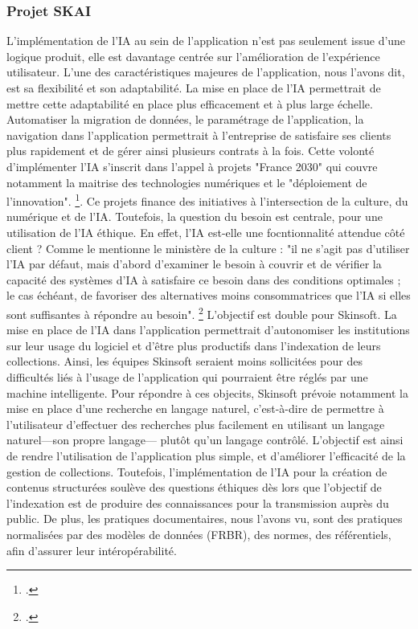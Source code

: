 \subsubsection{Projet SKAI}
L'implémentation de l'IA au sein de l'application n'est pas seulement issue d'une logique produit, elle est davantage centrée sur l'amélioration de l'expérience utilisateur. L'une des caractéristiques majeures de l'application, nous l'avons dit, est sa flexibilité et son adaptabilité. La mise en place de l'IA permettrait de mettre cette adaptabilité en place plus efficacement et à plus large échelle. Automatiser la migration de données, le paramétrage de l'application, la navigation dans l'application permettrait à l'entreprise de satisfaire ses clients plus rapidement et de gérer ainsi plusieurs contrats à la fois. Cette volonté d'implémenter l'IA s'inscrit dans l'appel à projets "France 2030" qui couvre notamment la maitrise des technologies numériques et le "déploiement de l'innovation". \footcite{zotero-item-636}. Ce projets finance des initiatives à l'intersection de la culture, du numérique et de l'IA.
Toutefois, la question du besoin est centrale, pour une utilisation de l'IA éthique. En effet, l'IA est-elle une focntionnalité attendue côté client ? Comme le mentionne le ministère de la culture : "il ne s’agit pas d’utiliser l’IA par défaut, mais d’abord d’examiner le besoin à couvrir et de vérifier la capacité des systèmes d’IA à satisfaire ce besoin dans des conditions optimales ; le cas échéant, de favoriser des alternatives moins consommatrices que l’IA si elles sont suffisantes à répondre au besoin". \footcite{2025a} L'objectif est double pour Skinsoft. La mise en place de l'IA dans l'application permettrait d'autonomiser les institutions sur leur usage du logiciel et d'être plus productifs dans l'indexation de leurs collections. Ainsi, les équipes Skinsoft seraient moins sollicitées pour des difficultés liés à l'usage de l'application qui pourraient être réglés par une machine intelligente. Pour répondre à ces objecits, Skinsoft prévoie notamment la mise en place d'une recherche en langage naturel, c'est-à-dire de permettre à l'utilisateur d'effectuer des recherches plus facilement en utilisant un langage naturel---son propre langage--- plutôt qu'un langage contrôlé. L'objectif est ainsi de rendre l'utilisation de l'application plus simple, et d'améliorer l'efficacité de la gestion de collections.
Toutefois, l'implémentation de l'IA pour la création de contenus structurées soulève des questions éthiques dès lors que l'objectif de l'indexation est de produire des connaissances pour la transmission auprès du public. De plus, les pratiques documentaires, nous l'avons vu, sont des pratiques normalisées par des modèles de données (FRBR), des normes, des référentiels, afin d'assurer leur intéropérabilité. 
